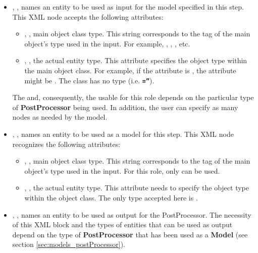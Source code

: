 \begin{itemize}
\item {}, , names an entity to
  be used as input for the model specified in this step.
  This XML node accepts the following attributes:
\begin{itemize}
  \item {}, , main object class
    type.
    This string corresponds to the tag of the main object's type used in the
    input.
    For example, , , ,
    etc.
  \item {}, , the actual entity
    type.
    This attribute specifies the object type within the main object class.
    For example, if the   attribute is ,
    the  attribute might be .
    \nb The class  has no type (i.e.
    \textbf{\texttt{=''}}).
\end{itemize}
\nb The  and, consequently,  the  usable for this
role depends on the particular type of \textbf{PostProcessor} being used.
In addition, the user can specify as many  nodes as needed by the
model.
\item {}, , names an entity to
be used as a model for this step.
This XML node recognizes the following attributes:
\begin{itemize}
  \item {}, , main object class
    type.
    This string corresponds to the tag of the main object's type used in the
    input.
    For this role, only  can be used.
  \item {}, , the actual entity
    type.
    This attribute needs to specify the object type within the
     object class.
    The only type accepted here is .
\end{itemize}
\item {}, , names an
  entity to be used as output for the PostProcessor.
  The necessity of this XML block and the types of entities that can be used as
  output depend on the type of \textbf{PostProcessor} that has been used as a
  \textbf{Model} (see section \ref{sec:models_postProcessor}).

\end{itemize}
